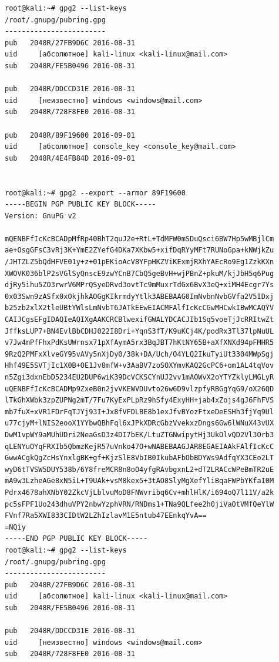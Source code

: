\begin{verbatim}
root@kali:~# gpg2 --list-keys
/root/.gnupg/pubring.gpg
------------------------
pub   2048R/27FB9D6C 2016-08-31
uid     [абсолютное] kali-linux <kali-linux@mail.com>
sub   2048R/FE5B0496 2016-08-31

pub   2048R/DDCCD31E 2016-08-31
uid     [неизвестно] windows <windows@mail.com>
sub   2048R/728F8FE0 2016-08-31

pub   2048R/89F19600 2016-09-01
uid     [абсолютное] console_key <console_key@mail.com>
sub   2048R/4E4FB84D 2016-09-01


root@kali:~# gpg2 --export --armor 89F19600
-----BEGIN PGP PUBLIC KEY BLOCK-----
Version: GnuPG v2

mQENBFfIcKcBCADpMfRp40BhT2quJ2e+RtL+TdMFW0mSDuQsci6BW7Hp5wMBjlCm
ae+OsgGFsC3vRj3K+YmE2ZYefG4DKa7XKbw5+xifDqRYyMFt7RUNoGpa+kNWjkZu
/JHTZLZ5bQdHFVE01y+z+01pEKioAcV8YFpHKZViKExmjRXhYAEcRo9Eg1ZzkKXn
XWOVK036blP2sVGlSyQnscE9zwYCnB7CbQ5geBvH+wjPBnZ+pkuM/kjJbH5q6Pug
djRy5ihu5ZO3rwrV6MPrQSyeDRvd3ovtTc9mMuxrTdGx6BvX3eQ+xiMH4Ecgr7Ys
0x03Swn9zASfx0xOkjhkAOGgKIkrmdyYtlk3ABEBAAG0ImNvbnNvbGVfa2V5IDxj
b25zb2xlX2tleUBtYWlsLmNvbT6JATkEEwEIACMFAlfIcKcCGwMHCwkIBwMCAQYV
CAIJCgsEFgIDAQIeAQIXgAAKCRCBlwexifGWALYDCACJIb1Sq5voeTjJcRRItwZt
JffksLUP7+BN4EvlBbCDHJ022I8Dri+YqnS3fT/K9uKCj4K/podRx3Tl37lpNuUL
v7Jw4mPfFhxPdKsUWrnsx71pXfAymA5rx3BqJBT7hKtNY65B+aXfXNXd94pFMHR5
9RzQ2PMFxXlveGY95vAVy5nXjDy0/38k+DA/Uch/O4YLQ2IkuTyiUt3304MWpSgj
Hhf49E5SVTjIc1X0B+OE1Jv8mfW+v3AaBV7zoSOXYmvKAQ2GcPC6+om1AL4tqVov
n5Zgi3dxnEbD5234EU2DUP6wiK39DcVCKSCYnUJ2vv1mAOWvX2oYTYZklyLMGLyR
uQENBFfIcKcBCADMp9ZxeB0n2jvVKEWVDUvto26w6D9vlzpfyRBGgYqG9/oX26QD
lTkGhXWbk3zpZUPNg2mT/7Fu7KyExPLpRz9hSfy4ExyHH+jab4xZojs4gJ6FhFVS
mb7fuX+xVR1FDrFqTJYj93I+Jx8fVFDLBE8b1exJfvBYozFtxeDeESHh3fjYq9Ul
u77cjyM+lNIS2eooX1YYbwQBhFql6xJPkXDRcGbzVvekxzDngs6Gw6lWNuX43vUX
DwM1vpWY9aMUhUDri2NeaGsD3z4DI7bEK/LtuZTGNwipytHj3UkOlvQD2Vl3Orb3
qLENYuOYqFRXIb5QbmzKejR57uVnko47O+wNABEBAAGJAR8EGAEIAAkFAlfIcKcC
GwwACgkQgZcHsYnxlgBK+gf+KjzSlE8VbIB0IkubAFbObBDYWs9AdfqYX3CEo2LT
wyD6tTVSW5DUY538b/6Y8freMCR8n8oO4yfgRAvbgxnL2+dT2LRACcWPeBmTR2uE
mA9w3LzheAGe8xN5iL+T9UAk+vsM8kex5+3tAO8SlyMgXefYliBqaFWPbYKfaI0M
Pdrx4678ahXNbY02ZkcVjLblvuMoD8FNWvribq6Cv+mhlHlK/i694oQ7l11V/a2k
pc5sFPF1Uo243dhuVPY2nbwYzphVRN/RNDms1+TNa9QLfee2h0jiVaOtVMfQeYlW
FVnf7Ra5XWI833CIDtW2LZhIzlavM1E5ntub47EEnkqYvA==
=NQiy
-----END PGP PUBLIC KEY BLOCK-----
root@kali:~# gpg2 --list-keys
/root/.gnupg/pubring.gpg
------------------------
pub   2048R/27FB9D6C 2016-08-31
uid     [абсолютное] kali-linux <kali-linux@mail.com>
sub   2048R/FE5B0496 2016-08-31

pub   2048R/DDCCD31E 2016-08-31
uid     [неизвестно] windows <windows@mail.com>
sub   2048R/728F8FE0 2016-08-31


\end{verbatim}
